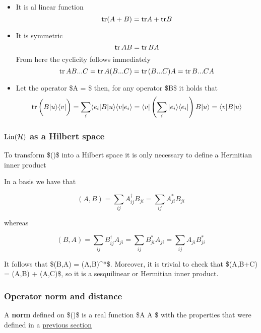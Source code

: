 \documentclass[11pt]{article}
\providecommand{\tightlist}{%
      \setlength{\itemsep}{0pt}\setlength{\parskip}{0pt}}
\begin{document}
\begin{itemize}
\tightlist
\item
  It is al linear function \[
  {\rm tr} (A + B ) = {\rm tr}A + {\rm tr}B
  \]
\end{itemize}

    \begin{itemize}
\tightlist
\item
  It is symmetric \[
  {\rm tr} \, AB= {\rm tr} \, BA 
  \] From here the cyclicity follows immediately \[
  {\rm tr} \, AB...C = {\rm tr}\,  A(B...C) = {\rm tr} \, (B...C) A = {\rm tr}\,  B...C A
  \]
\end{itemize}

    \begin{itemize}
\tightlist
\item
  Let the operator \$A = \$ then, for any operator \$B\$ it
  holds that
  \[ \tr \left(B\rule{0mm}{5mm}\ketbra{u}{v}\right) = \sum_i \bra{e_i} B\ket{u}\braket{v}{e_i} = \bra{v}\left(\sum_i \ketbra{e_i}{e_i}\right) B\ket{u} = \bra{v}B \ket{u}
  \]
\end{itemize}

    \subsubsection{\texorpdfstring{\(\hbox{Lin}({\cal H})\) as a Hilbert
space}{\textbackslash Lin(\textbackslash Hil) as a Hilbert space}}\label{linhil-as-a-hilbert-space}

    To transform \$\Lin(\Hil)\$ into a Hilbert space it is only necessary to
define a Hermitian inner product

    In a basis we have that

\[
(A,B) = \sum_{ij} A^\dagger_{ij} B_{ji} = \sum_{ij} A^*_{ji} B_{ji}
\]

whereas

\[
(B,A) = \sum_{ij} B^\dagger_{ij} A_{ji} = \sum_{ij} B^*_{ji} A_{ji} =
 \sum_{ij} A_{ji}B^*_{ji} 
\]

It follows that \$(B,A) = (A,B)\^{}*\$. Moreover, it is trivial to check
that \$(A,B+C) = (A,B) + (A,C)\$, so it is a sesquilinear or Hermitian
inner product.

    \subsubsection{Operator norm and
distance}\label{operator-norm-and-distance}

    A \textbf{norm} defined on \$\Lin(\Hil)\$ is a real function \$A
\to \textbar{} A\textbar{} \$ with the properties that
were defined in a
\href{../01_Formalismo/01_Vectores_en.ipynb\#norm}{previous section}
\end{document}
